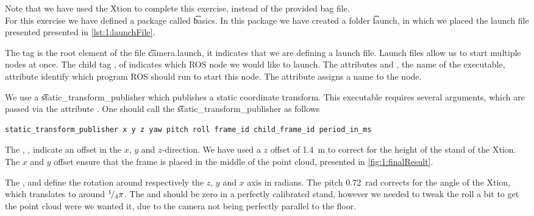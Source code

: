 Note that we have used the Xtion to complete this exercise, instead of the provided bag file.\\

For this exercise we have defined a package called \t{basics}. In this package we have created a folder \t{launch}, in which we placed the launch file presented presented in \cref{lst:1:launchFile}.



The tag  is the root element of the file \t{camera.launch}, it indicates that we are defining a launch file. Launch files allow us to start multiple nodes at once. The child tag , of  indicates which ROS node we would like to launch. The attributes  and , the name of the executable,  attribute identify which program ROS should run to start this node. The attribute  assigns a name to the node. 

We use a \t{static_transform_publisher} which publishes a static coordinate transform. This executable requires several arguments, which are passed via the attribute . One should call the \t{static_transform_publisher} as follows
\begin{lstlisting}[language=XML]
	static_transform_publisher x y z yaw pitch roll frame_id child_frame_id period_in_ms
\end{lstlisting}
The , ,  indicate an offset in the $x$, $y$ and $z$-direction. We have used a $z$ offset of \SI{1.4}{\meter} to correct for the height of the stand of the Xtion. The $x$ and $y$ offset ensure that the frame is placed in the middle of the point cloud, presented in \cref{fig:1:finalResult}. 

The ,  and  define the rotation around respectively the $z$, $y$ and $x$ axis in radians. The pitch \SI{0.72}{\radian} corrects for the angle of the Xtion, which translates to around ${}^{1}\!/_{4}\pi$. The  and  should be zero in a perfectly calibrated stand, however we needed to tweak the roll a bit to get the point cloud were we wanted it, due to the camera not being perfectly parallel to the floor. 

